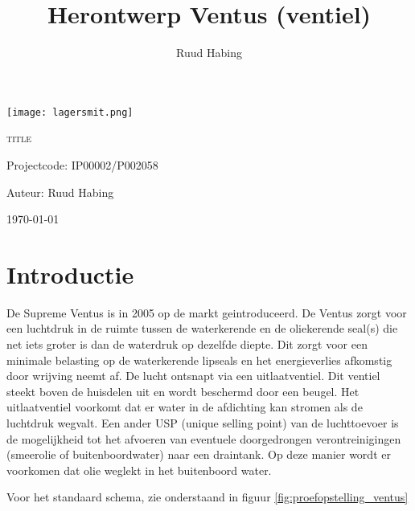 \documentclass[11pt,a4paper,twoside]{report}
\author{Ruud Habing}
\title{Herontwerp Ventus (ventiel)}
\begin{document}
\begin{titlepage}
	\centering
	\texttt{[image: lagersmit.png]}\par
		
	{\scshape\huge {{ title }}\par}
     
    Projectcode: IP00002/P002058
    
	\vspace{2cm}
	\vspace{1cm}
	{\Large Auteur: Ruud Habing\par}


	{\large \today\par}
\end{titlepage}

\tableofcontents
\newpage

\chapter{Introductie}

De Supreme Ventus is in 2005 op de markt geintroduceerd. De Ventus zorgt voor een luchtdruk in de ruimte tussen de waterkerende en de oliekerende seal(s) die net iets groter is dan de waterdruk op dezelfde diepte. Dit zorgt voor een minimale belasting op de waterkerende lipseals en het energieverlies afkomstig door wrijving neemt af. De lucht ontsnapt via een uitlaatventiel. Dit ventiel steekt boven de huisdelen uit en wordt beschermd door een beugel. Het uitlaatventiel voorkomt dat er water in de afdichting kan stromen als de luchtdruk wegvalt. Een ander USP (unique selling point) van de luchttoevoer is de mogelijkheid tot het afvoeren van eventuele doorgedrongen verontreinigingen (smeerolie of buitenboordwater) naar een draintank. Op deze manier wordt er voorkomen dat olie weglekt in het buitenboord water. 

Voor het standaard schema, zie onderstaand in figuur \ref{fig:proefopstelling_ventus}
\end{document}
